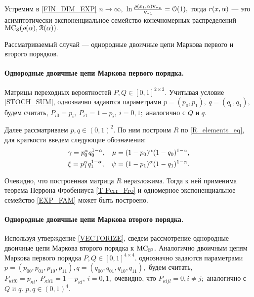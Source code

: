 Устремим в \eqref{FIN_DIM_EXP} $n \rightarrow \infty,$ $\ln \frac{\rho(x_1, \alpha){{\mathbf{v}_\ast}}_n}{{{\mathbf{v}_\ast}}_1} = \mathcal{O}(1),$ тогда $r(x, \alpha)$ --- это асимптотически экспоненциальное семейство конечномерных распределений $\mathrm{MC}_{\mathcal{S}}(\rho(\alpha), \mathcal{R}(\alpha)).$ 


Рассматриваемый случай --- однородные двоичные цепи Маркова первого и второго порядков. 

\paragraph{Однородные двоичные цепи Маркова первого порядка.}

Матрицы переходных вероятностей $P, Q \in [0, 1]^{2 \times 2}.$ Учитывая условие \eqref{STOCH_SUM}, однозначно задаются параметрами $p = (p_0, p_1),\  q = (q_0, q_1),$ будем считать, $P_{i0} = p_i, \ P_{i1} = 1 - p_i, \ i = 0, 1;$ аналогично с $Q$ и $q.$

Далее рассматриваем $p, q \in (0, 1)^{2}.$ По ним построим $R$ по \eqref{R_elements_eq}, для краткости введем следующие обозначения:
\begin{align}
\label{R_1}
& \gamma = p_0^\alpha q_0^{1 - \alpha}, & \mu = (1 - p_0)^\alpha (1 - q_0)^{1 - \alpha}, \nonumber \\
& \xi = p_1^\alpha q_1^{1 - \alpha}, & \psi = (1 - p_1)^\alpha (1 - q_1)^{1 - \alpha}. 
\end{align}

Очевидно, что построенная матрица $R$ неразложима. Тогда к ней применима теорема Перрона-Фробениуса \ref{T-Perr_Fro} и одномерное экспоненциальное семейство \eqref{EXP_FAM} может быть построено.

\paragraph{Однородные двоичные цепи Маркова второго порядка.} 

Используя утверждение \ref{VECTORIZE}, сведем рассмотрение однородные двоичные цепи Маркова второго порядка к $\mathrm{MC}_{\mathbb{B}^2}.$ Аналогично двоичным цепям Маркова первого порядка $P, Q \in [0, 1]^{4 \times 4}.$ однозначно задаются параметрами $p = (p_{00}, p_{01}, p_{10}, p_{11}), q = (q_{00}, q_{01}, q_{10}, q_{11}),$ будем считать, $P_{{\kappa}i i0} = p_{{\kappa}i}, \ P_{{\kappa}i i1} = 1 - p_{{\kappa}i}, \ i = 0, 1,$ очевидно, что $P_{{\kappa}i jl} = 0, i \neq j;$ аналогично с $Q$ и $q.$ $p, q \in (0, 1)^{4}.$

